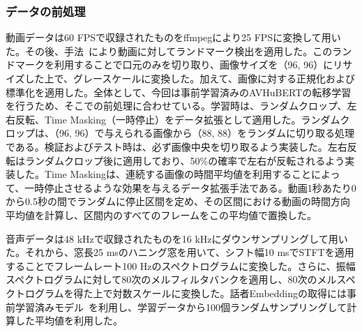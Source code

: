 \documentclass[12pt]{jarticle}
\numberwithin{equation}{section}    %
\numberwithin{figure}{section}      %
\numberwithin{table}{section}      %
\begin{document}
\begin{table}[bt]
    \centering
    \caption{利用したデータセットの文章数}
    \label{sec4:tab:dataset_info}
    \begin{center}
        \renewcommand{\arraystretch}{0.9} %
        \setlength{\tabcolsep}{8pt}      %
    \end{center}
\end{table}

\subsubsection{データの前処理}
動画データは60 FPSで収録されたものをffmpegにより25 FPSに変換して用いた。その後、手法~\cite{bulat2017far}により動画に対してランドマーク検出を適用した。このランドマークを利用することで口元のみを切り取り、画像サイズを（96, 96）にリサイズした上で、グレースケールに変換した。加えて、画像に対する正規化および標準化を適用した。全体として、今回は事前学習済みのAVHuBERTの転移学習を行うため、そこでの前処理に合わせている。学習時は、ランダムクロップ、左右反転、Time Masking（一時停止）をデータ拡張として適用した。ランダムクロップは、（96, 96）で与えられる画像から（88, 88）をランダムに切り取る処理である。検証およびテスト時は、必ず画像中央を切り取るよう実装した。左右反転はランダムクロップ後に適用しており、50\%の確率で左右が反転されるよう実装した。Time Maskingは、連続する画像の時間平均値を利用することによって、一時停止させるような効果を与えるデータ拡張手法である。動画1秒あたり0から0.5秒の間でランダムに停止区間を定め、その区間における動画の時間方向平均値を計算し、区間内のすべてのフレームをこの平均値で置換した。

音声データは48 kHzで収録されたものを16 kHzにダウンサンプリングして用いた。それから、窓長25 msのハニング窓を用いて、シフト幅10 msでSTFTを適用することでフレームレート100 Hzのスペクトログラムに変換した。さらに、振幅スペクトログラムに対して80次のメルフィルタバンクを適用し、80次のメルスペクトログラムを得た上で対数スケールに変換した。話者Embeddingの取得には事前学習済みモデル~\cite{wan2018generalized}を利用し、学習データから100個ランダムサンプリングして計算した平均値を利用した。
\end{document}
